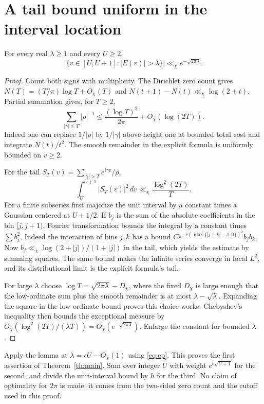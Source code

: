 \documentclass[11pt]{article}
\begin{document}
\section{A tail bound uniform in the interval location}
\begin{lemma}\label{lem:tail}
For every real $\lambda\ge1$ and every $U\ge2$,
\[
 |\{v\in[U,U+1]: |E(v)|>\lambda\}|
       \ll_\chi e^{-\sqrt{2\pi\lambda}} .
\]
\end{lemma}
\begin{proof}
Count both signs with multiplicity. The Dirichlet zero count \cite{count}
gives $N(T)=(T/\pi)\log T+O_\chi(T)$ and
$N(t+1)-N(t)\ll_\chi\log(2+t)$. Partial summation gives, for $T\ge2$,
\[
 \sum_{|\gamma|\le T}|\rho|^{-1}
 \le \frac{(\log T)^2}{2\pi}+O_\chi(\log(2T)).
\]
Indeed one can replace $1/|\rho|$ by $1/|\gamma|$ above height one
at bounded total cost and integrate $N(t)/t^2$. The smooth remainder in
the explicit formula is uniformly bounded on $v\ge2$.

For the tail $S_T(v)=\sum_{|\gamma|>T} e^{i\gamma v}/\rho$,
\[
 \int_U^{U+1}|S_T(v)|^2\,dv\ll_\chi\frac{\log^2(2T)}{T}.
\]
For a finite subseries first majorize the unit interval by a constant
times a Gaussian centered at $U+1/2$. If $b_j$ is the sum of the absolute
coefficients in the bin $[j,j+1)$, Fourier transformation bounds the
integral by a constant times $\sum b_j^2$. Indeed the interaction of bins
$j,k$ has a bound $C e^{-c(\max\{|j-k|-1,0\})^2} b_jb_k$.
Now $b_j\ll_\chi\log(2+|j|)/(1+|j|)$ in the tail, which yields the
estimate by summing squares. The same bound makes the infinite series
converge in local $L^2$, and its distributional limit is the explicit
formula's tail.

For large $\lambda$ choose $\log T=\sqrt{2\pi\lambda}-D_\chi$, where the
fixed $D_\chi$ is large enough that the low-ordinate sum plus the smooth
remainder is at most $\lambda-\sqrt{\lambda}$. Expanding the square in
the low-ordinate bound proves this choice works. Chebyshev's inequality
then bounds the exceptional measure by
$O_\chi(\log^2(2T)/(\lambda T))=O_\chi(e^{-\sqrt{2\pi\lambda}})$.
Enlarge the constant for bounded $\lambda$.
\end{proof}
Apply the lemma at $\lambda=\epsilon U-O_\chi(1)$ using \eqref{eq:ep}.
This proves the first assertion of Theorem~\ref{th:main}. Sum over
integer $U$ with weight $e^{b\sqrt{U+1}}$ for the second, and divide
the unit-interval bound by $h$ for the third. No claim of optimality
for $2\pi$ is made; it comes from the two-sided zero count and the
cutoff used in this proof.
\end{document}
